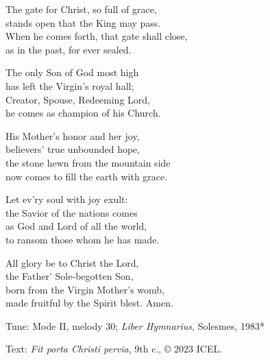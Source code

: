 \hymn

\settowidth{\versewidth}{When he comes forth, that gate shall close,}

\begin{hymnverse}%
The gate for Christ, so full of grace,\\
stands open that the King may pass.\\
When he comes forth, that gate shall close,\\
as in the past, for ever sealed.

The only Son of God most high\\
has left the Virgin’s royal hall;\\
Creator, Spouse, Redeeming Lord,\\
he comes as champion of his Church.

His Mother’s honor and her joy,\\
believers’ true unbounded hope,\\
the stone hewn from the mountain side\\
now comes to fill the earth with grace.

Let ev’ry soul with joy exult:\\
the Savior of the nations comes\\
as God and Lord of all the world,\\
to ransom those whom he has made.

All glory be to Christ the Lord,\\
the Father’ Sole-begotten Son,\\
born from the Virgin Mother’s womb,\\
made fruitful by the Spirit blest. Amen.
\end{hymnverse}

\begin{hymnsource}
Tune: Mode II, melody 30; \emph{Liber Hymnarius}, Solesmes, 1983*

Text: \emph{Fit porta Christi pervia}, 9th c., © 2023 ICEL.
\end{hymnsource}